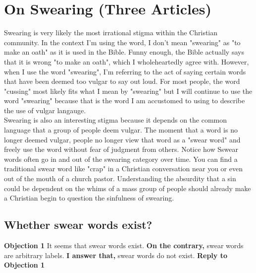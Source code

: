 \documentclass[a4paper, parskip=full, 12pt]{article}
\begin{document}
\section{On Swearing (Three Articles)}
Swearing is very likely the most irrational stigma within the Christian community. In the context I'm using the word, I don't mean "swearing" as "to make an oath" as it is used in the Bible. Funny enough, the Bible actually says that it is wrong "to make an oath", which I wholeheartedly agree with. However, when I use the word "swearing", I'm referring to the act of saying certain words that have been deemed too vulgar to say out loud. For most people, the word "cussing" most likely fits what I mean by "swearing" but I will continue to use the word "swearing" because that is the word I am accustomed to using to describe the use of vulgar langauge. \\
\break
Swearing is also an interesting stigma because it depends on the common language that a group of people deem vulgar. The moment that a word is no longer deemed vulgar, people no longer view that word as a "swear word" and freely use the word without fear of judgment from others. Notice how Sswear words often go in and out of the swearing category over time. You can find a traditional swear word like "crap" in a Christian conversation near you or even out of the mouth of a church pastor. Understanding the absurdity that a sin could be dependent on the whims of a mass group of people should already make a Christian begin to question the sinfulness of swearing. \\

\subsection{Whether swear words exist?}
\textbf{Objection 1} It seems that swear words exist.
\textbf{On the contrary,} swear words are arbitrary labels.
\textbf{I answer that,} swear words do not exist.
\textbf{Reply to Objection 1}
\end{document}

